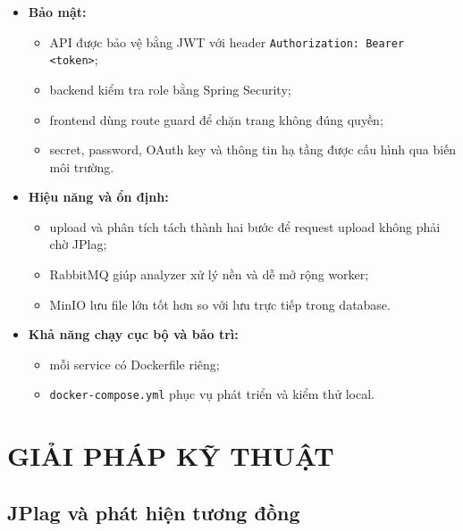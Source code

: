 \documentclass[12pt,a4paper]{article}
\begin{document}
\begin{itemize}
    \item \textbf{Bảo mật:}
    \begin{itemize}
        \item API được bảo vệ bằng JWT với header \texttt{Authorization: Bearer <token>};
        \item backend kiểm tra role bằng Spring Security;
        \item frontend dùng route guard để chặn trang không đúng quyền;
        \item secret, password, OAuth key và thông tin hạ tầng được cấu hình qua biến môi trường.
    \end{itemize}
    \item \textbf{Hiệu năng và ổn định:}
    \begin{itemize}
        \item upload và phân tích tách thành hai bước để request upload không phải chờ JPlag;
        \item RabbitMQ giúp analyzer xử lý nền và dễ mở rộng worker;
        \item MinIO lưu file lớn tốt hơn so với lưu trực tiếp trong database.
    \end{itemize}
    \item \textbf{Khả năng chạy cục bộ và bảo trì:}
    \begin{itemize}
        \item mỗi service có Dockerfile riêng;
        \item \texttt{docker-compose.yml} phục vụ phát triển và kiểm thử local.
    \end{itemize}
\end{itemize}

\section{GIẢI PHÁP KỸ THUẬT}

\subsection{JPlag và phát hiện tương đồng}
\end{document}
